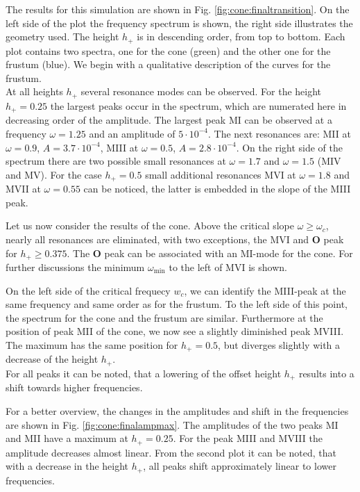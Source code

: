 The results for this simulation are shown in Fig. \ref{fig:cone:finaltransition}.
On the left side of the plot  the frequency spectrum is shown, the right side illustrates the geometry used.
The height $h_+$ is in descending order, from top to bottom.
Each plot contains two spectra, one for the cone (green)  and the other one for the frustum (blue).
We begin with a qualitative description of the curves for the frustum.\\
At all heights $h_+$ several resonance modes can be observed. For the height ${h_+=0.25}$
the largest peaks occur in the spectrum, which are numerated here in decreasing order of the amplitude.
The largest peak M\RN{1} can be observed at a frequency $\omega=1.25$ and an amplitude of $5\cdot10^{-4}$.
The next resonances are: M\RN{2} at $\omega=0.9$, $A=3.7\cdot10^{-4}$, M\RN{3} at $\omega=0.5$,  $A=2.8\cdot10^{-4}$.
On the right side of the spectrum there are two possible small resonances at $\omega=1.7$ and $\omega=1.5$ (M\RN{4} and M\RN{5}).
For the case $h_+=0.5$  small additional resonances  M\RN{6} at $\omega=1.8$ and M\RN{7} at $\omega=0.55$ can be noticed,
the latter is embedded in the slope of the M\RN{3} peak.

Let us now consider the results of the cone.
Above the critical slope $\omega\geq\omega_c$, nearly all resonances are eliminated,
with two exceptions, the M\RN{6} and \textbf{O} peak for $h_+\geq0.375$.
The \textbf{O} peak can be associated with an M\RN{1}-mode for the cone.
For further discussions the minimum $\omega_{\text{min}}$ to the left of M\RN{6} is shown.

On the left side of the critical frequecy $w_c$, we can identify the M\RN{3}-peak
at the same frequency and same order as for the frustum. To the left side of this point, the spectrum for
the cone and the frustum are similar.
Furthermore at the position of peak M\RN{2} of the cone, we now see a slightly diminished peak M\RN{8}.
The maximum has the same position for $h_+=0.5$, but diverges slightly with a decrease of the height $h_+$.\\
For all peaks  it can be noted, that a lowering of the offset height $h_+$ results
into a shift towards higher frequencies. %

For a better overview, the changes in the amplitudes and shift in the frequencies are shown in
Fig. \ref{fig:cone:finalampmax}. %
The amplitudes of the two peaks M\RN{1} and M\RN{2} have a maximum at $h_+= 0.25$. For the peak M\RN{3} and M\RN{8} the amplitude decreases almost linear.
From the second plot it can be noted, that with a decrease in the height $h_+$,
all peaks shift approximately linear to lower frequencies.

